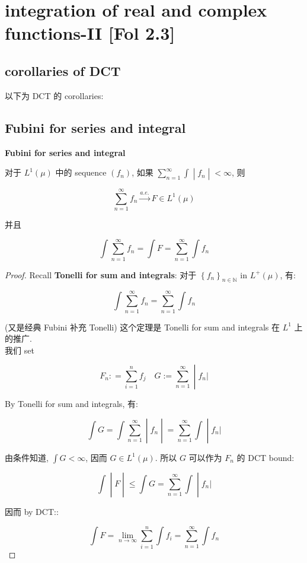 \documentclass{qlnotes-export}
\begin{document}
\section{integration of real and complex functions-II {[}Fol 2.3{]}}

\subsection{corollaries of DCT}\label{corollaries-of-dct}

以下为 DCT 的 corollaries:

\subsection{Fubini for series and integral}\label{fubini-for-series-and-integral}

\begin{corollary}{\protect{}\label{kn-fubini-for-series-and-integral}{\textbf{Fubini
for series and integral}}}

对于 \(L^{1}(\mu)\) 中的 sequence \((f_{n})\), 如果 \(\left. \sum_{n = 1}^{\infty}\int \middle| f_{n} \middle| < \infty \right.\), 则

\[\sum\limits_{n = 1}^{\infty}f_{n}\overset{a.e.}{\rightarrow}F \in L^{1}(\mu)\]

并且

\[\int\sum\limits_{n = 1}^{\infty}f_{n} = \int F = \sum\limits_{n = 1}^{\infty}\int f_{n}\]

\end{corollary}

\begin{proof}

Recall \textbf{Tonelli for sum and integrals}: 对于 \(\left\{ f_{n} \right\}_{n \in {\mathbb{N}}}\) in \(L^{+}(\mu)\), 有:

\[\int\sum\limits_{n = 1}^{\infty}f_{n} = \sum\limits_{n = 1}^{\infty}\int f_{n}\]

(又是经典 Fubini 补充 Tonelli) 这个定理是 Tonelli for sum and integrals 在 \(L^{1}\) 上的推广.\\
我们 set

\[\left. F_{n}: = \sum\limits_{i = 1}^{n}f_{j}\quad G := \sum\limits_{n = 1}^{\infty} \middle| f_{n}| \right.\]

By Tonelli for sum and integrals, 有:

\[\left. \int G = \int\sum\limits_{n = 1}^{\infty} \middle| f_{n} \middle| = \sum\limits_{n = 1}^{\infty}\int \middle| f_{n}| \right.\]

由条件知道, \(\int G < \infty\), 因而 \(G \in L^{1}(\mu)\). 所以 \(G\) 可以作为 \(F_{n}\) 的 DCT bound:

\[\left. \int \middle| F \middle| \leq \int G = \sum\limits_{n = 1}^{\infty}\int \middle| f_{n}| \right.\]

因而 by DCT::

\[\int F = \lim\limits_{n\rightarrow\infty}\sum\limits_{i = 1}^{n}\int f_{i} = \sum\limits_{n = 1}^{\infty}\int f_{n}\]

\end{proof}
\end{document}
